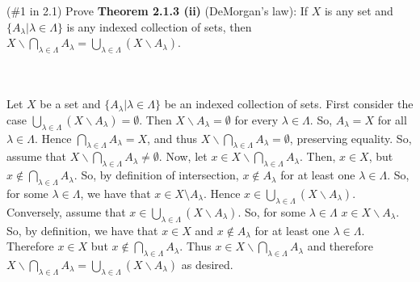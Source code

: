 (\#1 in 2.1) Prove \textbf{Theorem 2.1.3 (ii)} (DeMorgan's law): If $X$ is any set and
$\{A_{\lambda}|\lambda\in\Lambda\}$ is any indexed collection of sets, then
$X\backslash \bigcap_{\lambda\in\Lambda} A_{\lambda} = 
\bigcup_{\lambda\in\Lambda}(X\backslash A_{\lambda})$.\\\\

\begin{solution}\renewcommand{\qedsymbol}{}\ \\
    Let $X$ be a set and $\{A_{\lambda}|\lambda\in\Lambda\}$ be an indexed collection of sets. First
    consider the case $\bigcup_{\lambda\in\Lambda}(X\backslash A_{\lambda})=\emptyset$. Then
    $X\backslash A_{\lambda}=\emptyset$ for every $\lambda\in\Lambda$. So, $A_{\lambda}=X$ for all
    $\lambda\in\Lambda$. Hence $\bigcap_{\lambda\in\Lambda}A_{\lambda}=X$, and thus
    $X\backslash \bigcap_{\lambda\in\Lambda} A_{\lambda} =\emptyset$, preserving equality. So, assume
    that $X\backslash \bigcap_{\lambda\in\Lambda} A_{\lambda}\neq\emptyset$. Now, let
    $x\in X\backslash \bigcap_{\lambda\in\Lambda} A_{\lambda}$. Then, $x\in X$, but
    $x\notin\bigcap_{\lambda\in\Lambda} A_{\lambda}$. So, by definition of intersection,
    $x\notin A_{\lambda}$ for at least one $\lambda\in\Lambda$. So, for some $\lambda\in\Lambda$, we
    have that $x\in X\setminus A_{\lambda}$. Hence
    $x\in\bigcup_{\lambda\in\Lambda}(X\backslash A_{\lambda})$. Conversely, assume that
    $x\in\bigcup_{\lambda\in\Lambda}(X\backslash A_{\lambda})$. So, for some $\lambda\in\Lambda$
    $x\in X\backslash A_{\lambda}$. So, by definition, we have that $x\in X$ and $x\notin A_{\lambda}$
    for at least one $\lambda\in\Lambda$. Therefore $x\in X$ but
    $x\notin\bigcap_{\lambda\in\Lambda} A_{\lambda}$. Thus
    $x\in X\backslash \bigcap_{\lambda\in\Lambda} A_{\lambda}$ and therefore
    $X\backslash \bigcap_{\lambda\in\Lambda} A_{\lambda} = 
    \bigcup_{\lambda\in\Lambda}(X\backslash A_{\lambda})$ as desired.

\end{solution}